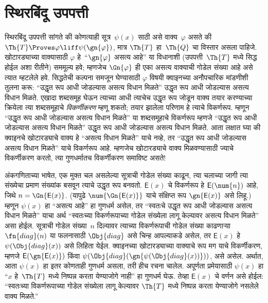 \section{स्थिरबिंदू उपपत्ती}\label{inc:inp:fix:sec}

\begin{explain}
स्थिरबिंदू उपपत्ती सांगते की कोणत्याही
सूत्र~$\psi(x)$ साठी असे वाक्य~$\varphi$ असते की
$\Th{T} \Proves \varphi \liff \psi(\gn{\varphi})$, मात्र
$\Th{T}$ हा~$\Th{Q}$ चा विस्तार असला पाहिजे.
खोटारड्याच्या वाक्यासाठी $\varphi$ हे~“$\gn{\varphi}$ असत्य आहे”
या विधानाशी (उपपत्ती~$\Th{T}$ मध्ये सिद्ध होईल अशा
रीतीने) सममूल्य हवे; म्हणजेच $\Gn{\varphi}$ ही एका असत्य
वाक्याची गोडेल संख्या आहे असे त्यात म्हटलेले हवे.
सिद्धतेची कल्पना समजून घेण्यासाठी $\varphi$ विषयी क्वाइनच्या
अनौपचारिक मांडणीशी तुलना करू: “उद्धृत रूप आधी जोडल्यास
असत्य विधान मिळते” उद्धृत रूप आधी जोडल्यास असत्य विधान
मिळते. एखादा शब्दसमूह घेऊन त्याच्या आधी त्याचेच उद्धृत
रूप जोडून वाक्य तयार करण्याच्या क्रियेला त्या शब्दसमूहाचे
\emph{विकर्णीकरण} म्हणू शकतो; तयार झालेला परिणाम हे
त्याचे विकर्णरूप. म्हणून “उद्धृत रूप आधी जोडल्यास असत्य
विधान मिळते” या शब्दसमूहाचे विकर्णरूप म्हणजे “उद्धृत रूप
आधी जोडल्यास असत्य विधान मिळते” उद्धृत रूप आधी
जोडल्यास असत्य विधान मिळते. आता लक्षात घ्या की क्वाइनचे
खोटारड्याचे वाक्य हे “असत्य विधान मिळते” याचे नव्हे,
तर “उद्धृत रूप आधी जोडल्यास असत्य विधान मिळते” याचे
विकर्णरूप आहे. म्हणजेच खोटारड्याचे वाक्य मिळवण्यासाठी
ज्याचे विकर्णीकरण करतो, त्या गुणधर्मातच विकर्णीकरण
समाविष्ट असते!{}

अंकगणिताच्या भाषेत, एक मुक्त चल असलेल्या
सूत्राची गोडेल संख्या काढून, त्या चलाच्या जागी
त्या संख्येचा प्रमाण संख्यांक बसवून त्याचे उद्धृत रूप
बनवतो. $\mathsf{E}(x)$ चे विकर्णरूप हे $\mathsf{E}(\num{n})$ आहे,
जिथे $n = \Gn{\mathsf{E}(x)}$. (यापुढे
$\num{\Gn{\mathsf{E}(x)}}$ याचे संक्षिप्त रूप
$\gn{\mathsf{E}(x)}$ असे लिहू.) म्हणून $\psi(x)$ हा
“असत्य आहे” हा गुणधर्म असेल, तर “स्वतःचे उद्धृत रूप
आधी जोडल्यास असत्य विधान मिळते” याचा अर्थ
“स्वतःच्या विकर्णरूपाच्या गोडेल संख्येला लागू केल्यावर
असत्य विधान मिळते” असा होईल. सूत्राची गोडेल
संख्या~$n$ दिल्यावर त्याच्या विकर्णरूपाची गोडेल संख्या
काढणाऱ्या $\fn{diag}(n)$ या फलनासाठी
$\Obj{diag}$ असे चिन्ह आपल्याकडे असेल, तर
$\mathsf{E}(x)$ हे $\psi(\Obj{diag}(x))$ असे लिहिता येईल.
क्वाइनच्या खोटारड्याच्या वाक्याचे रूप मग याचे
विकर्णीकरण, म्हणजे $\mathsf{E}(\gn{\mathsf{E}(x)})$ किंवा
$\psi(\Obj{diag}(\gn{\psi(\Obj{diag}(x))}))$, असे असेल.
अर्थात, आता $\psi(x)$ हा इतर कोणताही गुणधर्म असला,
तरी हीच रचना चालेल. अपूर्णता प्रमेयासाठी $\psi(x)$
हा “$x$ हे~$\Th{T}$ मध्ये निष्पन्न करता येण्याजोगे नाही” हा
गुणधर्म घेऊ. तेव्हा $\mathsf{E}(x)$ चे वर्णन असे होईल:
“स्वतःच्या विकर्णरूपाच्या गोडेल संख्येला लागू केल्यावर
$\Th{T}$ मध्ये निष्पन्न करता येण्याजोगे नसलेले
वाक्य मिळते.”


\end{explain}
